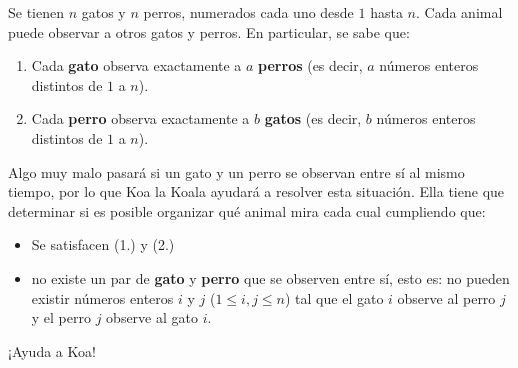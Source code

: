 Se tienen $n$ gatos y $n$ perros, numerados cada uno desde $1$ hasta $n$. Cada animal puede observar a otros gatos y perros. En particular, se sabe que:\\

\begin{enumerate}
  \item Cada \textbf{gato} observa exactamente a $a$ \textbf{perros} (es decir, $a$ números enteros distintos de $1$ a $n$).
  \item Cada \textbf{perro} observa exactamente a $b$ \textbf{gatos} (es decir, $b$ números enteros distintos de $1$ a $n$).
\end{enumerate}

Algo muy malo pasará si un gato y un perro se observan entre sí al mismo tiempo, por lo que Koa la Koala ayudará a resolver esta situación. Ella tiene que determinar si es posible organizar qué animal mira cada cual cumpliendo que:\\

\begin{itemize}
  \item Se satisfacen (1.) y (2.)
  \item no existe un par de \textbf{gato} y \textbf{perro} que se observen entre sí, esto es: no pueden existir números enteros $i$ y $j$ ($1 \le i, j \le n$) tal que el gato $i$ observe al perro $j$ y el perro $j$ observe al gato $i$.
\end{itemize}

¡Ayuda a Koa!


